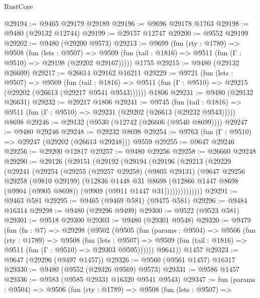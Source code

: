\begin{lexlean}{RustCore}
\begin{coremodule}
@29194 := @9465 @29179 @29189
@29196 := @9696 @29178 @1763
@29198 := @9480 (@29132 @12744)
@29199 := @29157 @12747
@29200 := @9552 @29199
@29202 := @9480 (@29200 @9573)
@29213 := @9699
    (fun (rty : @1789) =>
    @9508
      (fun (lets : @9507) =>
      @9509 (fun (tail : @1816) => @9511 (fun (Γ : @9510) => @29198 (@29202 @29167)))))
    @1755
@29215 := @9480 (@29132 @26609)
@29217 := @26614 @29162 @16211
@29229 := @9721
    (fun (lets : @9507) =>
    @9509
      (fun (tail : @1816) =>
      @9511 (fun (Γ : @9510) => @29215 (@29202 (@26613 (@29217 @9541 @9543))))))
    @1806
@29231 := @9480 (@29132 @26631)
@29232 := @29217 @1806
@29241 := @9745
    (fun (tail : @1816) => @9511 (fun (Γ : @9510) => @29231 (@29202 (@26613 (@29232 @9543)))))
    @8698
@29246 := @29132 (@9530 (@12742 (@26606 (@9540 @8699))))
@29247 := @9480 @29246
@29248 := @29232 @8698
@29254 := @9763 (fun (Γ : @9510) => @29247 (@29202 (@26613 @29248))) @9559
@29255 := @9647 @29246
@29256 := @29200 @12817
@29257 := @9480 @29256
@29258 := @26660 @29248
@29290 := @29126
    (@29151
      (@29192
        (@29194
          (@29196
            (@29213
              (@29229
                (@29241
                  (@29254
                    (@29255
                      (@29257 @29258)
                      (@9805 @29131)
                      (@9647
                        @29256
                        @29258
                        (@9810 @29199)
                        (@12836
                          @1448
                          @31
                          @8698
                          (@12866
                            @1447
                            @8698
                            (@9904 (@9905 @8698))
                            (@9909 (@9911 @1447 @31))))))))))))))
@29291 := @9463 @581
@29295 := @9465 (@9469 @581) (@9475 @581)
@29296 := @9484 @16314
@29298 := @9480 (@29296 @9499)
@29300 := @9522 (@9523 @581)
@29301 := @9518 @29300
@29303 := @9480 (@29301 @9548)
@29320 := @9479
    (fun (fn : @7) =>
    @29298
      (@9502
        (@9505
          (fun (params : @9504) =>
          @9506
            (fun (rty : @1789) =>
            @9508
              (fun (lets : @9507) =>
              @9509 (fun (tail : @1816) => @9511 (fun (Γ : @9510) => @29303 @9595))))))
        @9641))
    @1457
@29323 := @9647 (@29296 (@9497 @1457))
@29326 := @9560 (@9561 @1457) @16317
@29330 := @9480 (@9552 (@29326 @9569) @9573)
@29331 := @9586 @1457
@29336 := @9583 (@9585 @29331 @16320 @9541 @9543)
@29347 := fun (params : @9504) =>
  @9506
    (fun (rty : @1789) =>
    @9508
      (fun (lets : @9507) =>

\end{coremodule}
\end{lexlean}
